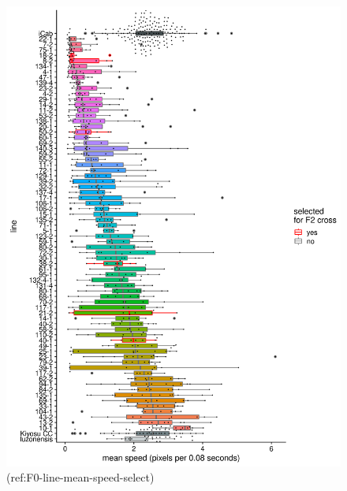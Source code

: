 \documentclass[
]{article}
\begin{document}
\begin{figure}
\includegraphics[width=1\linewidth]{figs/mikk_behaviour/line_mean_speed_0.05_selected} \caption{(ref:F0-line-mean-speed-select)}\label{fig:F0-line-mean-speed-select}
\end{figure}
\end{document}
